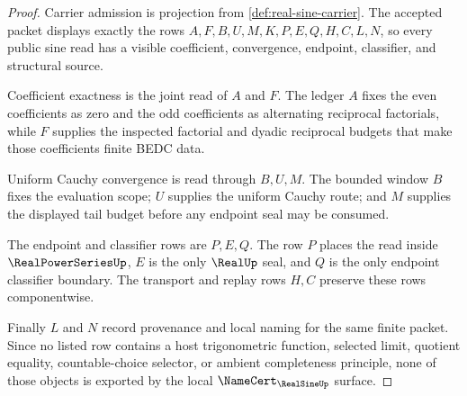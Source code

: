 \begin{proof}
Carrier admission is projection from \autoref{def:real-sine-carrier}. The accepted packet displays exactly the rows $A,F,B,U,M,K,P,E,Q,H,C,L,N$, so every public sine read has a visible coefficient, convergence, endpoint, classifier, and structural source.

Coefficient exactness is the joint read of $A$ and $F$. The ledger $A$ fixes the even coefficients as zero and the odd coefficients as alternating reciprocal factorials, while $F$ supplies the inspected factorial and dyadic reciprocal budgets that make those coefficients finite BEDC data.

Uniform Cauchy convergence is read through $B,U,M$. The bounded window $B$ fixes the evaluation scope; $U$ supplies the uniform Cauchy route; and $M$ supplies the displayed tail budget before any endpoint seal may be consumed.

The endpoint and classifier rows are $P,E,Q$. The row $P$ places the read inside $\RealPowerSeriesUp$, $E$ is the only $\RealUp$ seal, and $Q$ is the only endpoint classifier boundary. The transport and replay rows $H,C$ preserve these rows componentwise.

Finally $L$ and $N$ record provenance and local naming for the same finite packet. Since no listed row contains a host trigonometric function, selected limit, quotient equality, countable-choice selector, or ambient completeness principle, none of those objects is exported by the local $\NameCert_{\RealSineUp}$ surface.
\end{proof}

